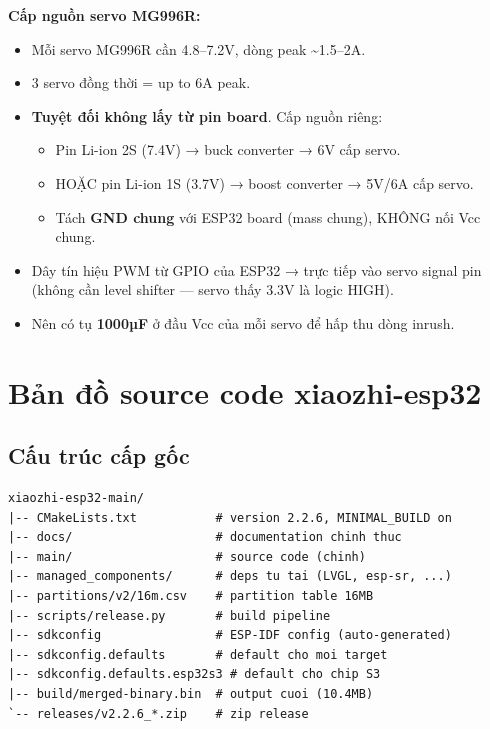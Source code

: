 \documentclass[11pt,a4paper]{article}
\begin{document}
\textbf{Cấp nguồn servo MG996R:}
\begin{itemize}
  \item Mỗi servo MG996R cần 4.8–7.2V, dòng peak \textasciitilde 1.5–2A.
  \item 3 servo đồng thời = up to 6A peak.
  \item \textbf{Tuyệt đối không lấy từ pin board}. Cấp nguồn riêng:
  \begin{itemize}
    \item Pin Li-ion 2S (7.4V) → buck converter → 6V cấp servo.
    \item HOẶC pin Li-ion 1S (3.7V) → boost converter → 5V/6A cấp servo.
    \item Tách \textbf{GND chung} với ESP32 board (mass chung), KHÔNG nối Vcc chung.
  \end{itemize}
  \item Dây tín hiệu PWM từ GPIO của ESP32 → trực tiếp vào servo signal pin (không cần level shifter — servo thấy 3.3V là logic HIGH).
  \item Nên có tụ \textbf{1000µF} ở đầu Vcc của mỗi servo để hấp thu dòng inrush.
\end{itemize}

\section{Bản đồ source code xiaozhi-esp32}
\subsection{Cấu trúc cấp gốc}
\begin{lstlisting}
xiaozhi-esp32-main/
|-- CMakeLists.txt           # version 2.2.6, MINIMAL_BUILD on
|-- docs/                    # documentation chinh thuc
|-- main/                    # source code (chinh)
|-- managed_components/      # deps tu tai (LVGL, esp-sr, ...)
|-- partitions/v2/16m.csv    # partition table 16MB
|-- scripts/release.py       # build pipeline
|-- sdkconfig                # ESP-IDF config (auto-generated)
|-- sdkconfig.defaults       # default cho moi target
|-- sdkconfig.defaults.esp32s3 # default cho chip S3
|-- build/merged-binary.bin  # output cuoi (10.4MB)
`-- releases/v2.2.6_*.zip    # zip release
\end{lstlisting}
\end{document}
